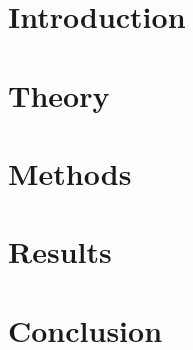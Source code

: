 \documentclass[
  10pt,
  b5paper,
  oneside
]{thesis}
\begin{document}
  
  \frontmatter
    
    
  \mainmatter
    
    \chapter{Introduction}
      

    \chapter{Theory}
      
 
    \chapter{Methods}
      

    \chapter{Results}
      

    \chapter{Conclusion}
      

  \backmatter
    
    \begin{appendices}
      
    \end{appendices}
    
\end{document}
